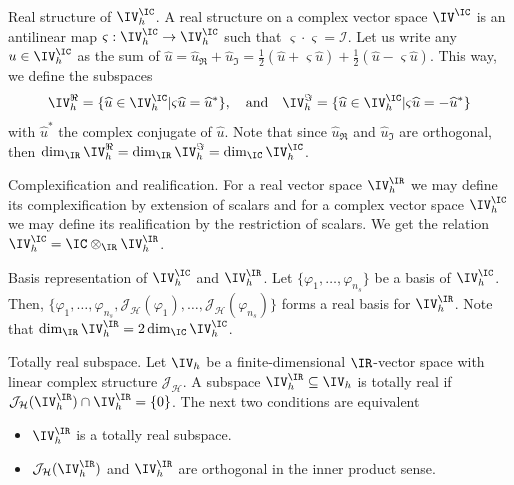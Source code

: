 \begin{definition} {Real structure of $\IV_h^\IC$.} \label{def:realstruc}
    A real structure on a complex vector space $\IV^\IC$ is an antilinear map $\varsigma: \IV_h^\IC \to \IV_h^\IC$ such that $\varsigma \cdot \varsigma = \mathcal{I}$. Let us write any $u \in \IV_h^\IC$ as the sum of $\widehat{u} = \widehat{u}_\Re + \widehat{u}_\Im = \frac{1}{2} (\widehat{u} + \varsigma \widehat{u}) + \frac{1}{2} (\widehat{u} - \varsigma \widehat{u})$. This way, we define the subspaces
    \begin{align}
        \IV_h^\Re = \{\widehat{u} \in \IV_h^\IC | \varsigma \widehat{u} = \widehat{u}^* \}, \quad \text{and} \quad
        \IV_h^\Im = \{\widehat{u} \in \IV_h^\IC | \varsigma \widehat{u} = -\widehat{u}^* \}
    \end{align}
    with $\widehat{u}^*$ the complex conjugate of $\widehat{u}$. Note that since $\widehat{u}_\Re$ and $\widehat{u}_\Im$ are orthogonal, then $\dim_\IR \IV_h^\Re = \dim_\IR \IV_h^\Im = \dim_\IC \IV_h^\IC$.
\end{definition}

\begin{definition} {Complexification and realification.} \label{def:complexification}
    For a real vector space $\IV_h^\IR$ we may define its complexification by extension of scalars and for a complex vector space $\IV_h^\IC$ we may define its realification by the restriction of scalars. We get the relation $\IV_h^{\IC} = \IC \otimes_{\IR} \IV_h^\IR$.
\end{definition}


\begin{proposition} {Basis representation of $\IV_h^\IC$ and $\IV_h^\IR$.} \label{prop:basisrc}
    Let $\{\varphi_1,\ldots,\varphi_{n_s}\}$ be a basis of $\IV_h^\IC$. Then, $\{\varphi_1,\ldots,\varphi_{n_s}, \mathcal{J}_\mathcal{H}(\varphi_1),\ldots,\mathcal{J}_\mathcal{H}(\varphi_{n_s})\}$ forms a real basis for $\IV_h^\IR$. Note that $\dim_\IR \IV_h^\IR = 2\dim_\IC \IV_h^\IC$.
\end{proposition}

\begin{proposition}{Totally real subspace.} \label{prop:realsubs}
    Let $\IV_h$ be a finite-dimensional $\IR$-vector space with linear complex structure $\mathcal{J}_{\mathcal{H}}$. A subspace $\IV_h^{\IR} \subseteq \IV_h$ is totally real if $\mathcal{J}_{\mathcal{H}}(\IV_h^{\IR}) \cap \IV_h^{\IR} = \{0\}$. The next two conditions are equivalent 
    \begin{itemize}
        \item $\IV_h^{\IR}$ is a totally real subspace.
        \item $\mathcal{J}_{\mathcal{H}}(\IV_h^{\IR})$ and $\IV_h^{\IR}$ are orthogonal in the inner product sense.
    \end{itemize}
\end{proposition}

